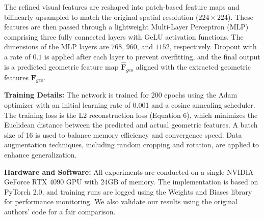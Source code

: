 The refined visual features are reshaped into patch-based feature maps and bilinearly upsampled to match the original spatial resolution ($224 \times 224$). These features are then passed through a lightweight Multi-Layer Perceptron (MLP) comprising three fully connected layers with GeLU activation functions. The dimensions of the MLP layers are $768$, $960$, and $1152$, respectively. Dropout with a rate of $0.1$ is applied after each layer to prevent overfitting, and the final output is a predicted geometric feature map $\hat{\mathbf{F}}_{geo}$ aligned with the extracted geometric features $\mathbf{F}_{geo}$.

\textbf{Training Details:} The network is trained for 200 epochs using the Adam optimizer \cite{kingma2014adam} with an initial learning rate of 0.001 and a cosine annealing scheduler. The training loss is the L2 reconstruction loss (Equation 6), which minimizes the Euclidean distance between the predicted and actual geometric features. A batch size of 16 is used to balance memory efficiency and convergence speed. Data augmentation techniques, including random cropping and rotation, are applied to enhance generalization.

\textbf{Hardware and Software:} All experiments are conducted on a single NVIDIA GeForce RTX 4090 GPU with 24GB of memory. The implementation is based on PyTorch 2.0, and training runs are logged using the Weights and Biases library for performance monitoring. We also validate our results using the original authors' code for a fair comparison. \\


